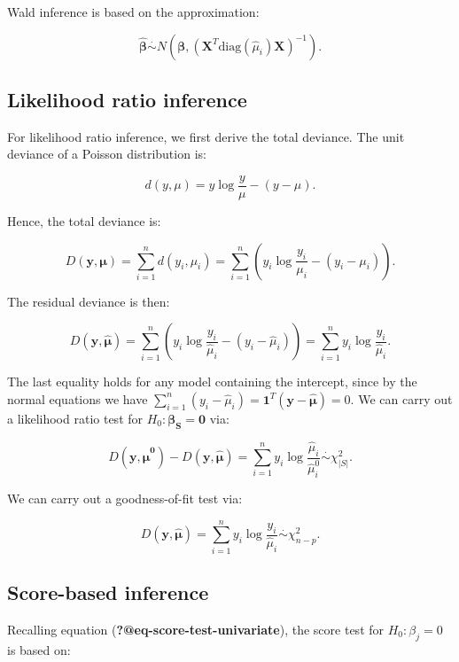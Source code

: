 \documentclass[
  11pt,
  letterpaper,
  oneside]{book}
\theoremstyle{plain}
\theoremstyle{definition}
\theoremstyle{definition}
\theoremstyle{plain}
\theoremstyle{plain}
\theoremstyle{remark}
\begin{document}
Wald inference is based on the approximation:

\[
\boldsymbol{\hat \beta} \overset \cdot \sim N(\boldsymbol{\beta}, (\boldsymbol{X}^T \text{diag}(\hat \mu_i)\boldsymbol{X})^{-1}).
\]

\hypertarget{sec-likelihood-ratio-inference}{%
\subsection{Likelihood ratio
inference}\label{sec-likelihood-ratio-inference}}

For likelihood ratio inference, we first derive the total deviance. The
unit deviance of a Poisson distribution is:

\[
d(y, \mu) = y \log \frac{y}{\mu} - (y - \mu).
\]

Hence, the total deviance is:

\[
D(\boldsymbol{y}, \boldsymbol{\mu}) = \sum_{i = 1}^n d(y_i, \mu_i) = \sum_{i = 1}^n \left(y_i \log \frac{y_i}{\mu_i} - (y_i - \mu_i)\right).
\]

The residual deviance is then:

\[
D(\boldsymbol{y}, \boldsymbol{\hat\mu}) = \sum_{i = 1}^n \left(y_i \log \frac{y_i}{\hat \mu_i} - (y_i - \hat \mu_i)\right) = \sum_{i = 1}^n y_i \log \frac{y_i}{\hat \mu_i}.
\]

The last equality holds for any model containing the intercept, since by
the normal equations we have
\(\sum_{i = 1}^n (y_i - \hat \mu_i) = \boldsymbol{1}^T (\boldsymbol{y} - \boldsymbol{\hat \mu}) = 0\).
We can carry out a likelihood ratio test for
\(H_0: \boldsymbol{\beta_S} = \boldsymbol{0}\) via:

\[
D(\boldsymbol{y}, \boldsymbol{\hat \mu^0}) - D(\boldsymbol{y}, \boldsymbol{\hat \mu}) = \sum_{i = 1}^n y_i \log \frac{\hat \mu_i}{\hat \mu^0_{i}} \overset{\cdot}\sim \chi^2_{|S|}.
\]

We can carry out a goodness-of-fit test via:

\[
D(\boldsymbol{y}, \boldsymbol{\hat\mu}) = \sum_{i = 1}^n y_i \log \frac{y_i}{\hat \mu_i} \overset{\cdot}\sim \chi^2_{n - p}.
\]

\hypertarget{sec-score-based-inference}{%
\subsection{Score-based inference}\label{sec-score-based-inference}}

Recalling equation (\textbf{?@eq-score-test-univariate}), the score test
for \(H_0: \beta_j = 0\) is based on:
\end{document}
